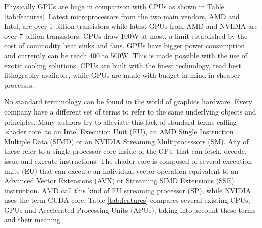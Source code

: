 \documentclass[Afour,sageh,times]{sagej}
\begin{document}


Physically GPUs are huge in comparison with CPUs as shown in Table \ref{tab:features}. Latest microprocessors from the two main vendors, AMD and Intel, are over 1 billion transistors while latest GPUs from AMD and NVIDIA \citep{nvidia} are over 7 billion transistors. CPUs draw 100W at most, a limit established by the cost of commodity heat sinks and fans. GPUs have bigger power consumption and currently can be reach 400 to 500W. This is made possible with the use of exotic cooling solutions. CPUs are built with the finest technology, read best lithography available, while GPUs are made with budget in mind in cheaper processes.

No standard terminology can be found in the world of graphics hardware.
Every company have a  different set of terms to refer to the same
underlying objects and principles. Many authors try to alleviate this
lack of standard terms calling `shader core' to an Intel Execution
Unit (EU), an AMD Single Instruction Multiple Data (SIMD) or an NVIDIA
Streaming Multiprocessors (SM). Any of these refer to a single
processor core inside of the GPU that can fetch, decode, issue and
execute instructions. The shader core is composed of several
execution units (EU) that can execute an individual vector operation
equivalent to an Advanced Vector Extensions (AVX) or Streaming SIMD
Extensions (SSE) instruction. AMD call this kind of EU streaming
processor (SP), while NVIDIA uses the term CUDA core. Table
\ref{tab:features} compares several existing CPUs, GPUs and
Accelerated Processing Units (APUs), taking into account these terms
and their meaning.
\end{document}
